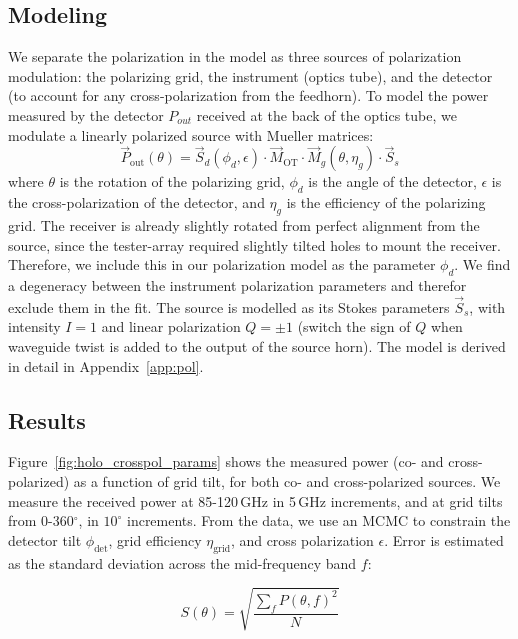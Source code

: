 \subsection{Modeling}
We separate the polarization in the model as three sources of polarization modulation: the polarizing grid, the instrument (optics tube), and the detector (to account for any cross-polarization from the feedhorn).  To model the power measured by the detector $P_{out}$ received at the back of the optics tube, we modulate a linearly polarized source with Mueller matrices:
\begin{equation}
    \vec{P}_{\text{out}}(\theta) = \vec{S}_{d}(\phi_{d},\epsilon)\cdot \vec{M}_{\text{OT}}\cdot \vec{M}_{g}(\theta,\eta_{g})\cdot \vec{S}_{s}
\end{equation}
where $\theta$ is the rotation of the polarizing grid, $\phi_d$ is the angle of the detector, $\epsilon$ is the cross-polarization of the detector, and $\eta_g$ is the efficiency of the polarizing grid.  The receiver is already slightly rotated from perfect alignment from the source, since the tester-array required slightly tilted holes to mount the receiver.  Therefore, we include this in our polarization model as the parameter $\phi_d$.  We find a degeneracy between the instrument polarization parameters and therefor exclude them in the fit.  The source is modelled as its Stokes parameters $\vec{S}_{s}$, with intensity $I=1$ and linear polarization $Q=\pm 1$ (switch the sign of $Q$ when waveguide twist is added to the output of the source horn).  The model is derived in detail in Appendix~\ref{app:pol}.  

\subsection{Results}
Figure~\ref{fig:holo_crosspol_params} shows the measured power (co- and cross-polarized) as a function of grid tilt, for both co- and cross-polarized sources.  We measure the received power at 85-120\,GHz in 5\,GHz increments, and at grid tilts from 0-360$^{\circ}$, in $10^{\circ}$ increments.  From the data, we use an MCMC to constrain the detector tilt $\phi_{\text{det}}$, grid efficiency $\eta_{\text{grid}}$, and cross polarization $\epsilon$.  Error is estimated as the standard deviation across the mid-frequency band $f$:

\begin{equation}
    S(\theta) = \sqrt{\frac{\sum_f P(\theta,f)^2}{N}}
\end{equation}

